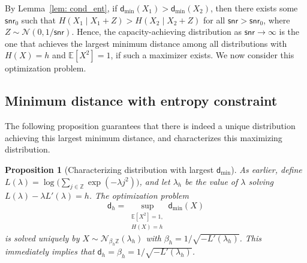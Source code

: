 \documentclass[11pt]{article}
\newcommand{\calN}{\mathcal{N}}
\newcommand{\calNdisc}[1]{\mathcal{N}_{#1 \bbZ}}
\newcommand{\snr}{\mathsf{snr}}
\newcommand{\bbE}{\mathbb{E}}
\newcommand{\bbZ}{\mathbb{Z}}
\newcommand{\dmin}{\mathsf{d}_{\min}}
\newcommand{\dist}{\mathsf{d}}
\newtheorem{proposition}{Proposition}
\begin{document}
	
	By Lemma~\ref{lem: cond_ent}, if $\dmin(X_1) > \dmin(X_2)$, then there exists some $\snr_0$ such that $H(X_1 \mid X_1 +Z) > H(X_2 \mid X_2+Z)$ for all $\snr > \snr_0$, where $Z \sim \calN(0,1/\snr)$.  Hence, the capacity-achieving distribution as $\snr \to \infty$ is the one that achieves the largest minimum distance among all distributions with $H(X) = h$ and $\bbE[X^2] = 1$, if such a maximizer exists.  We now consider this optimization problem.
	
	\subsection{Minimum distance with entropy constraint} \label{sec: dmin}
	

	The following proposition guarantees that there is indeed a unique distribution achieving this largest minimum distance, and characterizes this maximizing distribution. 

	
	\sloppy
	\begin{proposition}[Characterizing distribution with largest $\dmin$] \label{prop: dh}  As earlier, define $L(\lambda) = \log\big(\sum_{j \in \bbZ} \exp(-\lambda j^2)\big)$, and let $\lambda_h$ be the value of $\lambda$ solving $L(\lambda) - \lambda L'(\lambda) = h$. 
		The optimization problem 
		\begin{equation*}
			\dist_h = \sup_{\substack{\bbE[X^2] = 1,\\H(X) = h}} \dmin(X)
		\end{equation*}
		is solved uniquely by $X \sim \calNdisc{\beta_h}(\lambda_h)$ with $\beta_h = 1/\sqrt{-L'(\lambda_h)}$. This immediately implies that
		$\dist_h = \beta_h = 1/\sqrt{-L'(\lambda_h)}$.      
	\end{proposition}
	
\end{document}
